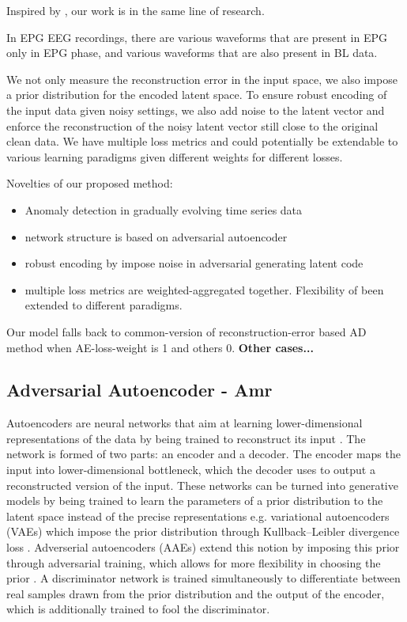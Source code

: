 \documentclass{article}
\begin{document}
	
	Inspired by \cite{makhzani2015adversarial}, our work is in the same line of research.
	
	

	
	In EPG EEG recordings, there are various waveforms that are present in EPG only in EPG phase, and various waveforms that are also present in BL data. 
	
	
	We not only measure the reconstruction error in the input space, we also impose a prior distribution for the encoded latent space. To ensure robust encoding of the input data given noisy settings, we also add noise to the latent vector and enforce the reconstruction of the noisy latent vector still close to the original clean data. We have multiple loss metrics and could potentially be extendable to various learning paradigms given different weights for different losses.
	
	
	Novelties of our proposed method:
	\begin{itemize}
		\item Anomaly detection in gradually evolving time series data
		\item network structure is based on adversarial autoencoder
		\item robust encoding by impose noise in adversarial generating latent code
		\item multiple loss metrics are weighted-aggregated together. Flexibility of been extended to different paradigms. 
	\end{itemize}
	Our model falls back to common-version of reconstruction-error based AD method when AE-loss-weight is 1 and others 0. \textbf{Other cases...}
	
	\subsection{Adversarial Autoencoder - Amr}
	Autoencoders are neural networks that aim at learning lower-dimensional representations of the data by being trained to reconstruct its input \cite{Hinton2006}. The network is formed of two parts: an encoder and a decoder. The encoder maps the input into lower-dimensional bottleneck, which the decoder uses to output a reconstructed version of the input. These networks can be turned into generative models by being trained to learn the parameters of a prior distribution to the latent space instead of the precise representations e.g. variational autoencoders (VAEs) which impose the prior distribution through Kullback–Leibler divergence loss \cite{Kingma2013}. Adverserial autoencoders (AAEs) extend this notion by imposing this prior through adversarial training, which allows for more flexibility in choosing the prior \cite{makhzani2015adversarial}. A discriminator network is trained simultaneously to differentiate between real samples drawn from the prior distribution and the output of the encoder, which is additionally trained to fool the discriminator.  
	
\end{document}

